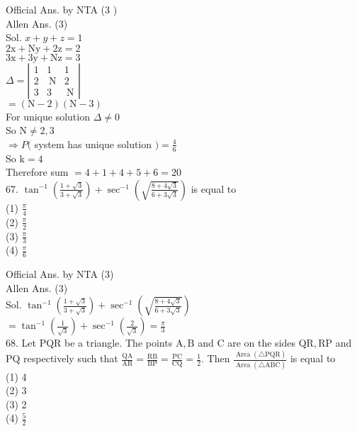 \documentclass[10pt]{article}
\begin{document}
Official Ans. by NTA (3 )\\
Allen Ans. (3)\\
Sol. \(x+y+z=1\)\\
\(2 \mathrm{x}+\mathrm{Ny}+2 \mathrm{z}=2\)\\
\(3 \mathrm{x}+3 \mathrm{y}+\mathrm{Nz}=3\)\\
\(\Delta=\left|\begin{array}{ccc}1 & 1 & 1 \\ 2 & \mathrm{~N} & 2 \\ 3 & 3 & \mathrm{~N}\end{array}\right|\)\\
\(=(\mathrm{N}-2)(\mathrm{N}-3)\)\\
For unique solution \(\Delta \neq 0\)\\
So \(\mathrm{N} \neq 2,3\)\\
\(\Rightarrow P(\) system has unique solution \()=\frac{4}{6}\)\\
So \(\mathrm{k}=4\)\\
Therefore sum \(=4+1+4+5+6=20\)\\
67. \(\tan ^{-1}\left(\frac{1+\sqrt{3}}{3+\sqrt{3}}\right)+\sec ^{-1}\left(\sqrt{\frac{8+4 \sqrt{3}}{6+3 \sqrt{3}}}\right)\) is equal to\\
(1) \(\frac{\pi}{4}\)\\
(2) \(\frac{\pi}{2}\)\\
(3) \(\frac{\pi}{3}\)\\
(4) \(\frac{\pi}{6}\)

Official Ans. by NTA (3)\\
Allen Ans. (3)\\
Sol. \(\tan ^{-1}\left(\frac{1+\sqrt{3}}{3+\sqrt{3}}\right)+\sec ^{-1}\left(\sqrt{\frac{8+4 \sqrt{3}}{6+3 \sqrt{3}}}\right)\)\\
\(=\tan ^{-1}\left(\frac{1}{\sqrt{3}}\right)+\sec ^{-1}\left(\frac{2}{\sqrt{3}}\right)=\frac{\pi}{3}\)\\
68. Let PQR be a triangle. The points \(\mathrm{A}, \mathrm{B}\) and C are on the sides \(\mathrm{QR}, \mathrm{RP}\) and PQ respectively such that \(\frac{\mathrm{QA}}{\mathrm{AR}}=\frac{\mathrm{RB}}{\mathrm{BP}}=\frac{\mathrm{PC}}{\mathrm{CQ}}=\frac{1}{2}\). Then \(\frac{\operatorname{Area}(\triangle \mathrm{PQR})}{\operatorname{Area}(\triangle \mathrm{ABC})}\) is equal to\\
(1) 4\\
(2) 3\\
(3) 2\\
(4) \(\frac{5}{2}\)
\end{document}
